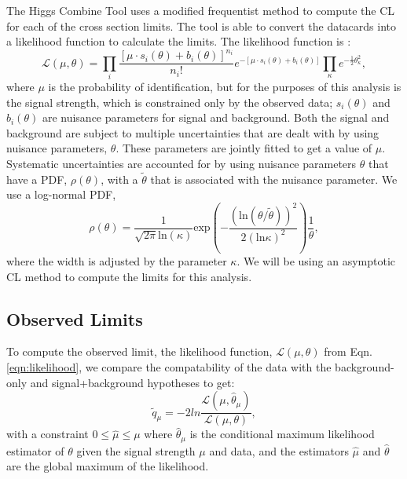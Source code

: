 The Higgs Combine Tool \cite{noauthor_procedure_2011} uses a modified frequentist method to compute the CL \cite{read_presentation_2002, junk_confidence_1999, read_modified_2000} for each of the cross section limits. The tool is able to convert the datacards into a likelihood function to calculate the limits. The likelihood function is \cite{noauthor_procedure_2011}:
\begin{equation}\label{eqn:likelihood}
\mathcal{L}(\mu,\theta)=\prod_i \frac{[\mu\cdot s_i(\theta)+b_i(\theta)]^{n_i}}{n_i !}e^{-[\mu\cdot s_i(\theta)+b_i(\theta)]}\prod_\kappa e^{-\frac{1}{2}\theta^2_\kappa},
\end{equation}
where $\mu$ is the probability of identification, but for the purposes of this analysis is the signal strength, which is constrained only by the observed data; $s_i(\theta)$ and $b_i(\theta)$ are nuisance parameters for signal and background. Both the signal and background are subject to multiple uncertainties that are dealt with by using nuisance parameters, $\theta$. These parameters are jointly fitted to get a value of $\mu$. Systematic uncertainties are accounted for by using nuisance parameters $\theta$ that have a PDF, $\rho(\theta)$, with a $\widetilde{\theta}$ that is associated with the nuisance parameter. We use a log-normal \cite{noauthor_procedure_2011} PDF, 
\begin{equation}\label{eqn:lognormal}
\rho(\theta)=\frac{1}{\sqrt{2\pi}\text{ln}(\kappa)}\text{exp}\left(-\frac{(\text{ln}(\theta/\widetilde{\theta}))^2}{2(\text{ln}\kappa)^2}\right)\frac{1}{\theta},
\end{equation}
where the width is adjusted by the parameter $\kappa$. We will be using an asymptotic CL method to compute the limits for this analysis. 

\subsection{Observed Limits}\label{sec:ObsLimits}

To compute the observed limit, the likelihood function, $\mathcal{L}(\mu,\theta)$ from Eqn. \ref{eqn:likelihood}, we compare the compatability of the data with the background-only and signal+background hypotheses to get:
\begin{equation}
\widetilde{q}_\mu=-2 ln\frac{\mathcal{L}(\mu,\hat{\theta}_\mu)}{\mathcal{L}(\mu,\theta)},
\end{equation}
with a constraint $0\leq\hat{\mu}\leq\mu$ where $\hat{\theta}_\mu$ is the conditional maximum likelihood estimator of $\theta$ given the signal strength $\mu$ and data, and the estimators $\hat{\mu}$ and $\hat{\theta}$ are the global maximum of the likelihood. 

